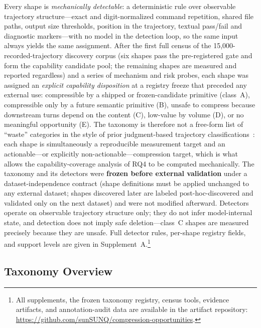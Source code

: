 ﻿\documentclass[sigconf,balance=false]{acmart}
\begin{document}
Every shape is \emph{mechanically detectable}: a deterministic rule over observable trajectory structure---exact and digit-normalized command repetition, shared file paths, output size thresholds, position in the trajectory, textual pass/fail and diagnostic markers---with no model in the detection loop, so the same input always yields the same assignment. After the first full census of the 15{,}000-recorded-trajectory discovery corpus (six shapes pass the pre-registered gate and form the capability candidate pool; the remaining shapes are measured and reported regardless) and a series of mechanism and risk probes, each shape was assigned an \emph{explicit capability disposition} at a registry freeze that preceded any external use: compressible by a shipped or frozen-candidate primitive (class~A), compressible only by a future semantic primitive (B), unsafe to compress because downstream turns depend on the content (C), low-value by volume (D), or no meaningful opportunity (E). The taxonomy is therefore not a free-form list of ``waste'' categories in the style of prior judgment-based trajectory classifications~\cite{agentdiet2026}: each shape is simultaneously a reproducible measurement target and an actionable---or explicitly non-actionable---compression target, which is what allows the capability-coverage analysis of RQ4 to be computed mechanically. The taxonomy and its detectors were \textbf{frozen before external validation} under a dataset-independence contract (shape definitions must be applied unchanged to any external dataset; shapes discovered later are labeled post-hoc-discovered and validated only on the next dataset) and were not modified afterward. Detectors operate on observable trajectory structure only; they do not infer model-internal state, and detection does not imply safe deletion---class~C shapes are measured precisely because they are unsafe. Full detector rules, per-shape registry fields, and support levels are given in Supplement~A.\footnote{All supplements, the frozen taxonomy registry, census tools, evidence artifacts, and annotation-audit data are available in the artifact repository: \url{https://github.com/sunSUNQ/compression-opportunities}.}

\subsection{Taxonomy Overview}
\end{document}
